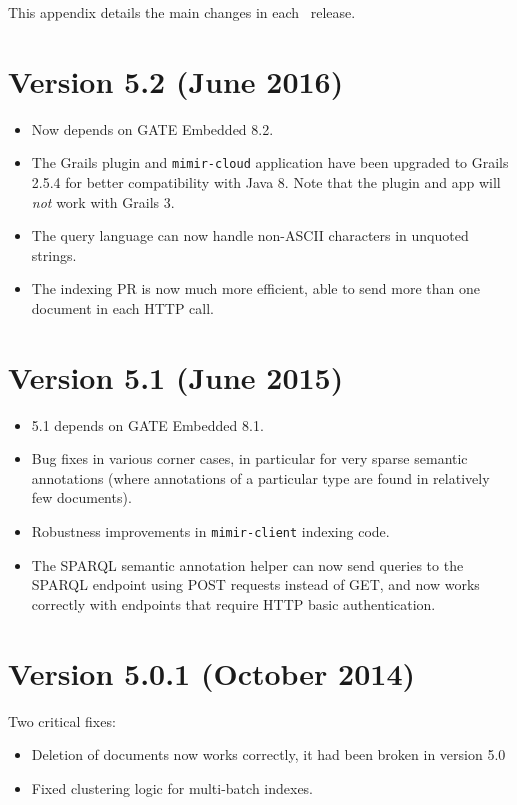 This appendix details the main changes in each \Mimir\ release.

\section{Version 5.2 (June 2016)}
\begin{itemize}
\item Now depends on GATE Embedded 8.2.
\item The Grails plugin and \verb!mimir-cloud! application have been upgraded
  to Grails 2.5.4 for better compatibility with Java 8.  Note that the plugin
  and app will \emph{not} work with Grails 3.
\item The query language can now handle non-ASCII characters in unquoted
  strings.
\item The \Mimir{} indexing PR is now much more efficient, able to send more
  than one document in each HTTP call.
\end{itemize}

\section{Version 5.1 (June 2015)}
\begin{itemize}
\item \Mimir{} 5.1 depends on GATE Embedded 8.1.
\item Bug fixes in various corner cases, in particular for very sparse semantic
  annotations (where annotations of a particular type are found in relatively
  few documents).
\item Robustness improvements in \verb!mimir-client! indexing code.
\item The SPARQL semantic annotation helper can now send queries to the SPARQL
  endpoint using POST requests instead of GET, and now works correctly with
  endpoints that require HTTP basic authentication.
\end{itemize}

\section{Version 5.0.1 (October 2014)}
Two critical fixes:
\begin{itemize}
  \item Deletion of documents now works correctly, it had been broken in
  version 5.0
  \item Fixed clustering logic for multi-batch indexes.
\end{itemize}

